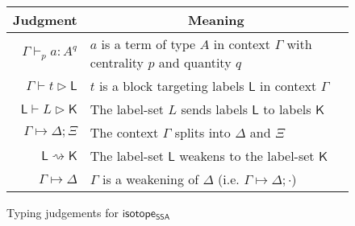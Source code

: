 \documentclass[acmsmall,screen,review]{acmart}
\newcommand{\ms}[1]{\ensuremath{\mathsf{#1}}}
\newcommand{\csplits}[3]{#1 \mapsto #2;#3}
\newcommand{\cwk}[2]{#1 \mapsto #2}
\newcommand{\lwk}[2]{#1 \rightsquigarrow #2}
\newcommand{\tlin}[2]{#2 \subseteq \ms{lin}(#1)}
\newcommand{\ltlin}[3]{#3 \subseteq \ms{lin}(#1) \cap #2}
\newcommand{\hasty}[5]{#1 \vdash_{#2} #3: {#4}^{#5}}
\newcommand{\haslb}[3]{#1 \vdash #2 \rhd #3}
\newcommand{\lhaslb}[3]{#1 \vdash #2 \rhd #3}
\newcommand{\isotopessa}{\ms{isotope_{SSA}}}
\begin{document}
\begin{figure}
  \begin{center}        
    \begingroup
    \renewcommand{\arraystretch}{1.5}
    \setlength{\tabcolsep}{2em}
    \begin{tabular}{rl}
        \multicolumn{1}{c}{Judgment} & \multicolumn{1}{c}{Meaning} \\ \hline
        \(\hasty{\Gamma}{p}{a}{A}{q}\) & \(a\) is a term of type \(A\) in
        context \(\Gamma\) with centrality \(p\) and quantity \(q\) \\
        \(\haslb{\Gamma}{t}{\ms{L}}\) & \(t\) is a block targeting labels
        \(\ms{L}\) in context \(\Gamma\) \\
        \(\lhaslb{\ms{L}}{L}{\ms{K}}\) & The label-set \(L\) sends labels
        \(\ms{L}\) to labels \(\ms{K}\) \\
        \(\csplits{\Gamma}{\Delta}{\Xi}\) & The context \(\Gamma\) splits into
        \(\Delta\) and \(\Xi\) \\
        \(\lwk{\ms{L}}{\ms{K}}\) & The label-set \(\ms{L}\) weakens to the
        label-set \(\ms{K}\) \\
        \(\cwk{\Gamma}{\Delta}\) &
        \(\Gamma\) is a weakening of \(\Delta\) 
        (i.e. \(\csplits{\Gamma}{\Delta}{\cdot}\))
    \end{tabular}
    \endgroup
  \end{center}
  \caption{Typing judgements for \isotopessa}
  \label{fig:ssa-judgements}
\end{figure}
\end{document}
